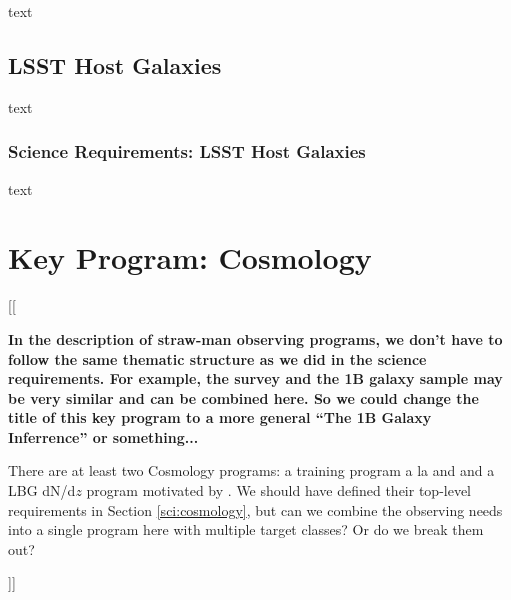 \documentclass[11pt,a4paper,twoside,onecolumn,openany,final,oldfontcommands]{memoir}
\newcommand{\edit}[2][todo]{{\color{#1}[[{\bf #2}]]}}
\begin{document}
\begin{sciencerequirement}

\reqitem text
\end{sciencerequirement}

\section{LSST Host Galaxies}

text

\subsection{Science Requirements: LSST Host Galaxies}

\begin{sciencerequirement}

\reqitem text
\end{sciencerequirement}


\newpage



\chapter{Key Program: Cosmology}\label{prog:cosmology}

\edit{In the description of straw-man observing programs, we don't have to follow the same thematic structure as we did in the science requirements.  For example, the \photoz{} survey and the 1B galaxy sample may be very similar and can be combined here.  So we could change the title of this key program to a more general ``The 1B Galaxy Inferrence'' or something...

There are at least two Cosmology programs: a \photoz{} training program a la \citet{newman15} and \citet{hemmati18} and a LBG dN/d$z$ program motivated by \citet{wilson19}.  We should have defined their top-level requirements in Section \ref{sci:cosmology}, but can we combine the observing needs into a single program here with multiple target classes?  Or do we break them out?}
\end{document}
